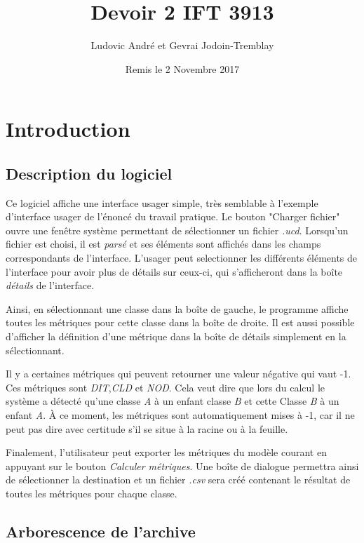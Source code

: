 \documentclass[letter,french]{report}
\begin{document}
	\title{Devoir 2 IFT 3913}
	\author{Ludovic André et Gevrai Jodoin-Tremblay}
	\date{Remis le 2 Novembre 2017}
	\maketitle
	
	
  \section*{Introduction}

	\subsection*{Description du logiciel}
	Ce logiciel affiche une interface usager simple, très semblable
	à l'exemple d'interface usager de l'énoncé du travail pratique. Le bouton "Charger
	fichier" ouvre une fenêtre système permettant de sélectionner un fichier \emph{.ucd}.
	Lorsqu'un fichier est choisi, il est \emph{parsé} et ses éléments sont affichés dans
	les champs correspondants de l'interface. L'usager peut selectionner les
  différents éléments de l'interface pour avoir plus de détails sur ceux-ci, qui
  s'afficheront dans la boîte \emph{détails} de l'interface.

  Ainsi, en sélectionnant une classe dans la boîte de gauche, le programme
  affiche toutes les métriques pour cette classe dans la boîte de droite. Il est
  aussi possible d'afficher la définition d'une métrique dans la boîte de
  détails simplement en la sélectionnant.
  
  Il y a certaines métriques qui peuvent retourner une valeur négative qui vaut
  -1. Ces métriques sont \emph{DIT},\emph{CLD} et \emph{NOD}. Cela veut dire que lors du
  calcul le système a détecté qu'une classe \emph{A} à un enfant classe \emph{B} et cette
  Classe \emph{B} à un enfant \emph{A}. À ce moment, les métriques sont automatiquement
  mises à -1, car il ne peut pas dire avec certitude s’il se situe à la racine
  ou à la feuille.

  Finalement, l'utilisateur peut exporter les métriques du modèle courant en
  appuyant sur le bouton \emph{Calculer métriques}. Une boîte de dialogue
  permettra ainsi de sélectionner la destination et un fichier \emph{.csv} sera
  créé contenant le résultat de toutes les métriques pour chaque classe.

  \subsection*{Arborescence de l'archive}
\end{document}
